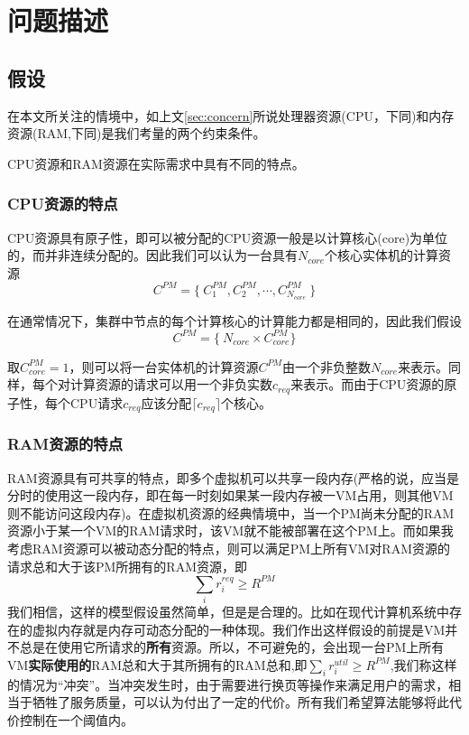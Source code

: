 
\chapter{问题描述}
\label{chap:3}

\section{假设}
\label{sec:scenario}

在本文所关注的情境中，如上文\eqref{sec:concern}所说处理器资源(CPU，下同)和内存资源(RAM,下同)是我们考量的两个约束条件。

CPU资源和RAM资源在实际需求中具有不同的特点。

\subsection{CPU资源的特点}
\label{sec:cpu-character}

CPU资源具有原子性，即可以被分配的CPU资源一般是以计算核心(core)为单位的，而并非连续分配的。因此我们可以认为一台具有$N_{core}$个核心实体机的计算资源
\begin{equation}
  \label{eq:1}
C^{PM}=\{\ C^{PM}_1,C^{PM}_2,\cdots,C^{PM}_{N_{core}}\ \}  
\end{equation}

在通常情况下，集群中节点的每个计算核心的计算能力都是相同的，因此我们假设
\begin{equation}
  \label{eq:2}
C^{PM}=\{\ N_{core}\times C^{PM}_{core} \}  
\end{equation}

取$C^{PM}_{core} = 1$，则可以将一台实体机的计算资源$C^{PM}$由一个非负整数$N_{core}$来表示。同样，每个对计算资源的请求可以用一个非负实数$c_{req}$来表示。而由于CPU资源的原子性，每个CPU请求$c_{req}$应该分配$\lceil c_{req} \rceil $个核心。

\subsection{RAM资源的特点}
\label{sec:ram-character}

RAM资源具有可共享的特点，即多个虚拟机可以共享一段内存(严格的说，应当是分时的使用这一段内存，即在每一时刻如果某一段内存被一VM占用，则其他VM则不能访问这段内存)。在虚拟机资源的经典情境中，当一个PM尚未分配的RAM资源小于某一个VM的RAM请求时，该VM就不能被部署在这个PM上。而如果我考虑RAM资源可以被动态分配的特点，则可以满足PM上所有VM对RAM资源的请求总和大于该PM所拥有的RAM资源，即
\begin{equation}
\sum_{i}r^{req}_i \geq R^{PM}
\end{equation}
我们相信，这样的模型假设虽然简单，但是是合理的。比如在现代计算机系统中存在的虚拟内存就是内存可动态分配的一种体现。我们作出这样假设的前提是VM并不总是在使用它所请求的\textbf{所有}资源。所以，不可避免的，会出现一台PM上所有VM\textbf{实际使用的}RAM总和大于其所拥有的RAM总和,即$\sum_{i}r^{util}_i \geq R^{PM}$,我们称这样的情况为``冲突''。当冲突发生时，由于需要进行换页等操作来满足用户的需求，相当于牺牲了服务质量，可以认为付出了一定的代价。所有我们希望算法能够将此代价控制在一个阈值内。

